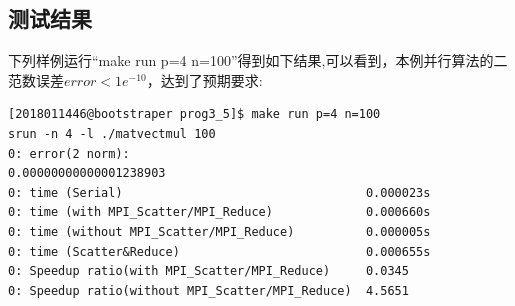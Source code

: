 \documentclass[UTF8, onecolumn, a4paper]{article}
\begin{document}
\subsection{测试结果}
下列样例运行“make run p=4 n=100”得到如下结果,可以看到，本例并行算法的二范数误差$error < 1e^{-10}$，达到了预期要求:
\begin{lstlisting}[language={}, title={$p=4, n=100$}]
[2018011446@bootstraper prog3_5]$ make run p=4 n=100
srun -n 4 -l ./matvectmul 100
0: error(2 norm):                                 0.00000000000001238903
0: time (Serial)                                  0.000023s 
0: time (with MPI_Scatter/MPI_Reduce)             0.000660s 
0: time (without MPI_Scatter/MPI_Reduce)          0.000005s 
0: time (Scatter&Reduce)                          0.000655s 
0: Speedup ratio(with MPI_Scatter/MPI_Reduce)     0.0345 
0: Speedup ratio(without MPI_Scatter/MPI_Reduce)  4.5651
\end{lstlisting}
\end{document}
